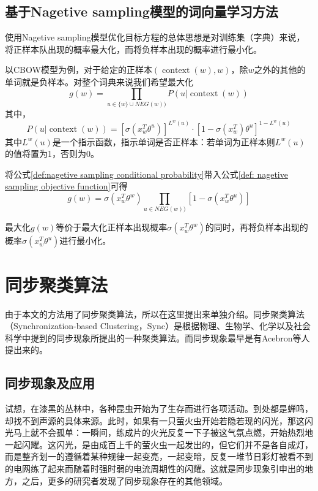 \subsection{基于Nagetive sampling模型的词向量学习方法}
使用Nagetive sampling模型优化目标方程的总体思想是对训练集（字典）来说，将正样本队出现的概率最大化，而将负样本出现的概率进行最小化。

以CBOW模型为例，对于给定的正样本$(\operatorname{context}(w), w)$，除$w$之外的其他的单词就是负样本。对整个词典来说我们希望最大化
\begin{equation}
g(w) = \prod_{u \in \{w\}\cup NEG(w))} P(u|\operatorname{context}(w))
\label{def: nagetive sampling objective function}
\end{equation}
其中，
\begin{equation}
P(u|\operatorname{context}(w)) = [\sigma(x_{w}^{T}\theta^u) ]^{L^w(u)}\cdot [1-\sigma(x_{w}^{T})\theta^u]^{1-L^w(u)}
\label{def:nagetive sampling conditional probability}
\end{equation}
其中$L^w(u)$是一个指示函数，指示单词是否正样本：若单词为正样本则$L^w(u)$的值将置为1，否则为0。

将公式\ref{def:nagetive sampling conditional probability}带入公式\ref{def: nagetive sampling objective function}可得
\begin{equation}{}
g(w) = \sigma(x_{w}^{T}\theta^w)\prod_{u \in NEG(w))}[1- \sigma(x_{w}^{T}\theta^u)] 
\end{equation}

最大化$g(w)$等价于最大化正样本出现概率$\sigma(x_{w}^{T}\theta^w)$的同时，再将负样本出现的概率$\sigma(x_{w}^{T}\theta^u)$进行最小化。


\section{同步聚类算法}
由于本文的方法用了同步聚类算法，所以在这里提出来单独介绍。同步聚类算法（Synchronization-based Clustering，Sync）是根据物理、生物学、化学以及社会科学中提到的同步现象所提出的一种聚类算法。而同步现象最早是有Acebron等人提出来的。

\subsection{同步现象及应用}
试想，在漆黑的丛林中，各种昆虫开始为了生存而进行各项活动。到处都是蝉鸣，却找不到声源的具体来源。此时，如果有一只萤火虫开始若隐若现的闪光，那这闪光马上就不会孤单：一瞬间，练成片的火光反复一下子被这气氛点燃，开始热烈地一起闪耀。这闪光，是由成百上千的萤火虫一起发出的，但它们并不是各自成灯，而是整齐划一的遵循着某种规律一起变亮，一起变暗，反复一堆节日彩灯被看不到的电网练了起来而随着时强时弱的电流周期性的闪耀。这就是同步现象引申出的地方，之后，更多的研究者发现了同步现象存在的其他领域。

